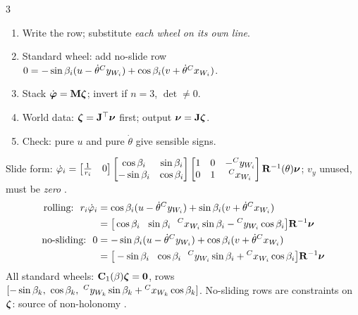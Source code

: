 \begin{multicols}{3}
\begin{recipe}
\begin{enumerate}
\item Write the row; substitute \emph{each wheel on its own line}.
\item Standard wheel: add no-slide row $0=-\sin\beta_i(u-\dot\theta{}^{C}y_{W_{i}})+\cos\beta_i(v+\dot\theta{}^{C}x_{W_{i}})$.
\item Stack $\dot{\boldsymbol\varphi}=\mathbf M\boldsymbol\zeta$; invert if $n=3$, $\det\ne0$.
\item World data: $\boldsymbol\zeta=\mathbf J^\top\boldsymbol\nu$ first; output $\boldsymbol\nu=\mathbf J\boldsymbol\zeta$.
\item Check: pure $u$ and pure $\dot\theta$ give sensible signs.
\end{enumerate}
\end{recipe}

\begin{fbx}[$\gamma_i=0$: fixed wheel $\beta_i$ const \pg{39}; steerable $\beta_i(t)$, extra input $\dot\beta_i$ \pg{42}]
Slide form: $\dot\varphi_i=\begin{bmatrix}\frac1{r_i}&0\end{bmatrix}\begin{bmatrix}\cos\beta_i&\sin\beta_i\\-\sin\beta_i&\cos\beta_i\end{bmatrix}\begin{bmatrix}1&0&-{}^{C}y_{W_{i}}\\0&1&{}^{C}x_{W_{i}}\end{bmatrix}\mathbf R^{-1}(\theta)\boldsymbol\nu$; $v_y$ unused, must be \emph{zero} .
\begin{align*}
\text{rolling:}\ \ r_i\dot\varphi_i&=\cos\beta_i(u-\dot\theta{}^{C}y_{W_{i}})+\sin\beta_i(v+\dot\theta{}^{C}x_{W_{i}})\\
&=\big[\cos\beta_i\ \ \sin\beta_i\ \ {}^{C}x_{W_{i}}\sin\beta_i-{}^{C}y_{W_{i}}\cos\beta_i\big]\mathbf R^{-1}\boldsymbol\nu\\
\text{no-sliding:}\ \ 0&=-\sin\beta_i(u-\dot\theta{}^{C}y_{W_{i}})+\cos\beta_i(v+\dot\theta{}^{C}x_{W_{i}})\\
&=\big[-\sin\beta_i\ \ \cos\beta_i\ \ {}^{C}y_{W_{i}}\sin\beta_i+{}^{C}x_{W_{i}}\cos\beta_i\big]\mathbf R^{-1}\boldsymbol\nu
\end{align*}
All standard wheels: $\mathbf C_1(\beta)\boldsymbol\zeta=\mathbf 0$, rows $[-\sin\beta_k,\ \cos\beta_k,\ {}^{C}y_{W_{k}}\sin\beta_k+{}^{C}x_{W_{k}}\cos\beta_k]$. No-sliding rows are constraints on $\boldsymbol\zeta$: source of non-holonomy .
\end{fbx}


\end{multicols}
